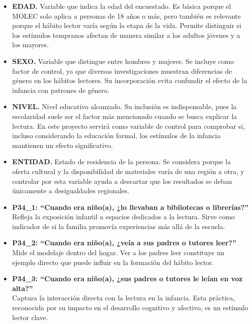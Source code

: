 \documentclass[aps,reprint]{revtex4-2}
\begin{document}
\begin{itemize}
    \item \textbf{EDAD.} Variable que indica la edad del encuestado. Es básica porque el MOLEC solo aplica a personas de 18 años o más, pero también es relevante porque el hábito lector varía según la etapa de la vida. Permite distinguir si los estímulos tempranos afectan de manera similar a los adultos jóvenes y a los mayores.
    
    \item \textbf{SEXO.} Variable que distingue entre hombres y mujeres. Se incluye como factor de control, ya que diversas investigaciones muestran diferencias de género en los hábitos lectores. Su incorporación evita confundir el efecto de la infancia con patrones de género.
    
    \item \textbf{NIVEL.} Nivel educativo alcanzado. Su inclusión es indispensable, pues la escolaridad suele ser el factor más mencionado cuando se busca explicar la lectura. En este proyecto servirá como variable de control para comprobar si, incluso considerando la educación formal, los estímulos de la infancia mantienen un efecto significativo.
    
    \item \textbf{ENTIDAD.} Estado de residencia de la persona. Se considera porque la oferta cultural y la disponibilidad de materiales varía de una región a otra, y controlar por esta variable ayuda a descartar que los resultados se deban únicamente a desigualdades regionales.
    
    \item \textbf{P34\_1: “Cuando era niño(a), ¿lo llevaban a bibliotecas o librerías?”} \\
    Refleja la exposición infantil a espacios dedicados a la lectura. Sirve como indicador de si la familia promovía experiencias más allá de la escuela.
    
    \item \textbf{P34\_2: “Cuando era niño(a), ¿veía a sus padres o tutores leer?”} \\
    Mide el modelaje dentro del hogar. Ver a los padres leer constituye un ejemplo directo que puede influir en la formación del hábito lector.
    
    \item \textbf{P34\_3: “Cuando era niño(a), ¿sus padres o tutores le leían en voz alta?”} \\
    Captura la interacción directa con la lectura en la infancia. Esta práctica, reconocida por su impacto en el desarrollo cognitivo y afectivo, es un estímulo lector clave.
    

\end{itemize}
\end{document}
